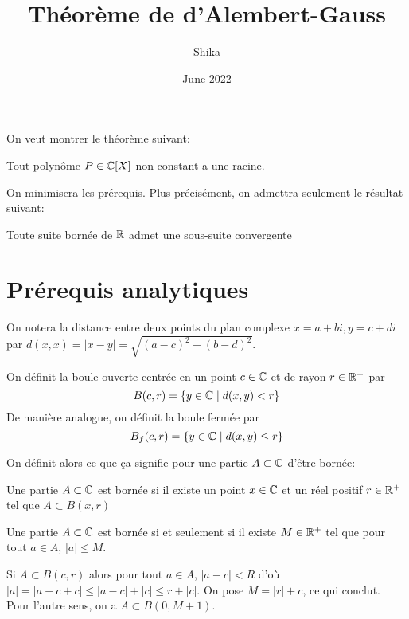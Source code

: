 \documentclass{article}
\title{Théorème de d'Alembert-Gauss}
\author{Shika}
\date{June 2022}
\begin{document}
\maketitle

On veut montrer le théorème suivant:

\begin{theoreme}
    Tout polynôme $P \in \mathbb{C}[X]$ non-constant a une racine.
\end{theoreme}

On minimisera les prérequis. Plus précisément, on admettra seulement le résultat suivant:

\begin{theoreme}
    Toute suite bornée de $\mathbb{R}$ admet une sous-suite convergente
\end{theoreme}

\section{Prérequis analytiques}
On notera la distance entre deux points du plan complexe $x = a+bi, y = c+di$ par $d(x, x) = |x-y| = \sqrt{(a-c)^2 + (b-d)^2}$.

\begin{definition}
    On définit la boule ouverte centrée en un point $c \in \mathbb{C}$ et de rayon $r \in \mathbb{R}^+$ par
    $$B(c, r) = \{y \in \mathbb{C} \mid d(x, y) < r\}$$
    De manière analogue, on définit la boule fermée par
    $$B_f(c, r) = \{y \in \mathbb{C} \mid d(x, y) \leq r\}$$
\end{definition}
On définit alors ce que ça signifie pour une partie $A \subset \mathbb{C}$ d'être bornée:
\begin{definition}
    Une partie $A \subset \mathbb{C}$ est bornée si il existe un point $x \in \mathbb{C}$ et un réel positif $r \in \mathbb{R}^+$ tel que $A \subset B(x, r)$
\end{definition}

\begin{proposition}
    Une partie $A \subset \mathbb{C}$ est bornée si et seulement si il existe $M \in \mathbb{R}^+$ tel que pour tout $a \in A$, $|a| \leq M$.
\end{proposition}

\begin{preuve}
    Si $A \subset B(c, r)$ alors pour tout $a \in A$, $|a - c| < R$ d'où $|a| = |a-c + c| \leq |a-c| + |c| \leq r + |c|$. On pose $M = |r| + c$, ce qui conclut.\\
    Pour l'autre sens, on a $A \subset B(0, M + 1)$.\\
\end{preuve}
\end{document}
